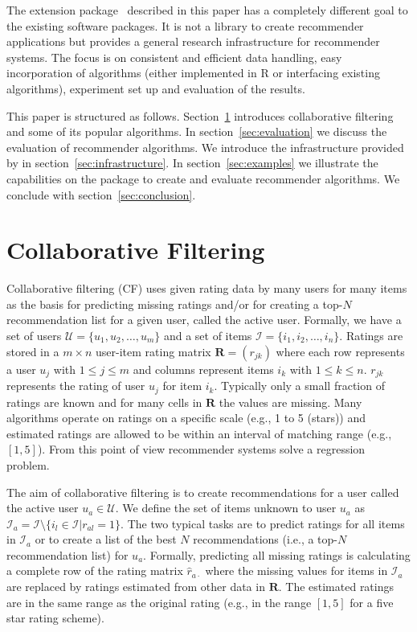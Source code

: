 \documentclass[nojss]{jss}
\newcommand{\set}[1]{\mathcal{#1}}
\newcommand{\mat}[1]{{\mathbf{#1}}}
\begin{document}
The  extension package~ 
described in this paper 
has a completely different goal to the existing software packages. It 
is not a library to create recommender applications
but provides a general research infrastructure for recommender systems.
The focus is on consistent and efficient data handling, 
easy incorporation of algorithms (either implemented in R or
interfacing existing algorithms), 
experiment set up and evaluation of the results. 

This paper is structured as follows. Section~\ref{sec:CF} introduces
collaborative filtering and 
some of its popular algorithms.
In section~\ref{sec:evaluation} we discuss the evaluation of recommender 
algorithms.
We introduce the infrastructure provided by 
in section~\ref{sec:infrastructure}. In section~\ref{sec:examples} we 
illustrate the capabilities on the package to create and evaluate
recommender algorithms. We conclude with section~\ref{sec:conclusion}.

\section{Collaborative Filtering}
\label{sec:CF}

Collaborative filtering (CF) uses given rating data by many users for many
items as the basis for predicting missing ratings and/or for creating 
a top-$N$ recommendation list for a given user, called the active user.  
Formally, we have a set of 
users $\set{U} = \{u_1, u_2, \ldots, u_m\}$ and a set of 
items $\set{I} = \{i_1, i_2, \ldots, i_n\}$.
Ratings are stored in a $m \times n$ user-item rating matrix $\mat{R} = (r_{jk})$ where
each row represents a user $u_j$ with $1 \le j\le m$ and columns represent
items $i_k$ with $1 \le k\le n$. $r_{jk}$ represents the rating of user
$u_j$ for item $i_k$.
Typically only a small fraction of ratings are
known and for many cells in $\mat{R}$ the values are missing. 
Many algorithms operate on ratings on a specific scale (e.g., 1 to 5 (stars))
and estimated ratings are allowed to be within an interval of matching range
(e.g., $[1,5]$). From this point of view recommender systems solve a regression
problem.

The aim of collaborative filtering is to create recommendations for a user
called the active user $u_a \in \set{U}$.  
We define the set of items unknown to user $u_a$ as 
$\set{I}_a = \set{I} \setminus \{i_l \in \set{I}| r_{al} = 1\}$.
The two typical tasks are to predict
ratings for all items in $\set{I}_a$ or to create a list of 
the best $N$ recommendations
(i.e., a top-$N$ recommendation list) for 
$u_a$. 
Formally, predicting all missing ratings is calculating a complete row of the
rating matrix $\hat{r}_{a\cdot}$ where the missing values 
for items in $\set{I}_a$
are replaced by ratings estimated from other data in $\mat{R}$.  
The estimated ratings are in the same range as the original rating 
(e.g., in the range $[1,5]$ for a five star rating scheme).
\end{document}
